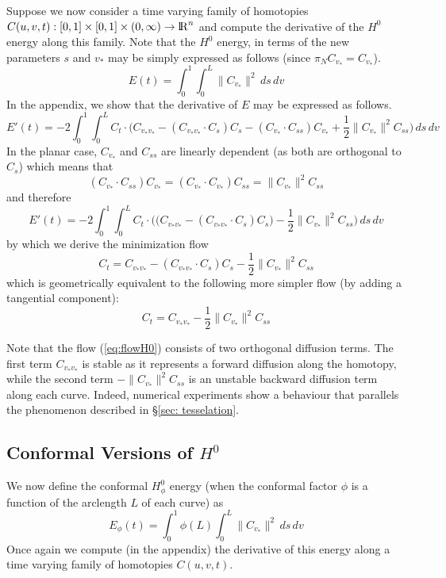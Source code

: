 \documentclass[twoside,a4paper,english]{article}
\def\v{{v_*}}
\begin{document}
Suppose we now consider a time varying family of
homotopies $C(u,v,t):[0,1]\times [0,1]\times (0,\infty)\to {\protect\mathrm{l\hskip-0.15em R}} ^n$
and compute the derivative of the $H^0$ energy along
this family. Note that the $H^0$ energy, in terms of
the new parameters $s$ and $\v$ may be simply expressed
as follows (since $\pi_N C_{\v}=C_{\v}$).
\begin{equation}
  E(t)=\int_0^1\int_0^L \big\|C_{\v}\big\|^2\,ds\,dv
\end{equation}
In the appendix, we show that the derivative of $E$ may be
expressed as follows.
\begin{equation}
  E'(t) =
      -2\int_0^1\int_0^L
        C_t\cdot\Big(
          C_{\v\v}\!-(C_{\v\v}\!\!\cdot C_s)C_s
         -(C_{\v}\!\!\cdot C_{ss})C_{\v}
         +\frac{1}{2}\|C_\v\|^2C_{ss}
        \Big)
      \,ds\,dv
\end{equation}
In the planar case, $C_{\v}$ and $C_{ss}$ are linearly dependent
(as both are orthogonal to $C_s$) which means that
\begin{equation}
  (C_{\v}\cdot C_{ss})C_{\v}=(C_{\v}\cdot C_{\v})C_{ss}=\|C_\v\|^2C_{ss}
\end{equation}
and therefore
\begin{equation}
E'(t)=
  -2\int_0^1\int_0^L
    C_t\cdot\Big(
      \big(C_{\v\v}-(C_{\v\v}\cdot C_s)C_s\big)-\frac{1}{2}\|C_\v\|^2C_{ss}
    \Big)
  \,ds\,dv
\end{equation}
by which we derive the minimization flow 
\[  C_t = C_{\v\v}-(C_{\v\v}\cdot C_s)C_s - \frac{1}{2}\|C_\v\|^2C_{ss} \]
which is geometrically equivalent to the following more simpler
flow (by adding a tangential component):
\begin{equation} \label{eq:flowH0}
  C_t = C_{\v\v} - \frac{1}{2}\|C_\v\|^2C_{ss}
\end{equation}

Note that the flow (\ref{eq:flowH0}) consists of two orthogonal
diffusion terms. The first term $C_{\v\v}$ is stable as it
represents a forward diffusion along the homotopy,
while the second term $-\|C_\v\|^2C_{ss}$ is an unstable
backward diffusion term along each curve.
Indeed, numerical experiments show a behaviour that parallels 
the phenomenon described in \S\ref{sec: tesselation}.

\subsection{Conformal Versions of $H^0$}

We now define the conformal $H^0_\phi$ energy (when the conformal
factor $\phi$ is a function of the arclength $L$ of each curve) as
\begin{equation}
  E_{\phi}(t)=\int_0^1 \phi(L) \int_0^L \big\|C_{\v}\big\|^2\,ds\,dv
\end{equation}
Once again we compute (in the appendix) the derivative of this
energy along a time varying family of homotopies $C(u,v,t)$.
\end{document}
